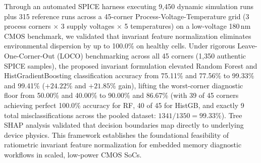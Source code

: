 \documentclass[conference]{IEEEtran}
\begin{document}
Through an automated SPICE harness executing 9,450 dynamic simulation runs plus 315 reference runs across a 45-corner Process-Voltage-Temperature grid (3 process corners $\times$ 3 supply voltages $\times$ 5 temperatures) on a low-voltage 180\,nm CMOS benchmark, we validated that invariant feature normalization eliminates environmental dispersion by up to 100.0\% on healthy cells. Under rigorous Leave-One-Corner-Out (LOCO) benchmarking across all 45 corners (1,350 authentic SPICE samples), the proposed invariant formulation elevated Random Forest and HistGradientBoosting classification accuracy from 75.11\% and 77.56\% to 99.33\% and 99.41\% ($+24.22\%$ and $+21.85\%$ gain), lifting the worst-corner diagnostic floor from 50.00\% and 40.00\% to 90.00\% and 86.67\% (with 39 of 45 corners achieving perfect 100.0\% accuracy for RF, 40 of 45 for HistGB, and exactly 9 total misclassifications across the pooled dataset: $1341/1350 = 99.33\%$). Tree SHAP analysis validated that decision boundaries map directly to underlying device physics. This framework establishes the foundational feasibility of ratiometric invariant feature normalization for embedded memory diagnostic workflows in scaled, low-power CMOS SoCs.

\end{document}
